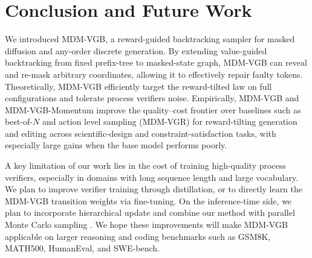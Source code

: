 \documentclass{article}
\numberwithin{theorem}{section}
\numberwithin{proposition}{section}
\numberwithin{corollary}{section}
\numberwithin{lemma}{section}
\numberwithin{conjecture}{section}
\numberwithin{remark}{section}
\numberwithin{definition}{section}
\numberwithin{assumption}{section}
\numberwithin{example}{section}
\newif\ifshowbibliography
\begin{document}
\section{Conclusion and Future Work}
\label{main:sec:Conclusion and Limitations}
We introduced MDM-VGB, a reward-guided backtracking sampler for masked diffusion and any-order discrete generation. By extending value-guided backtracking from fixed prefix-tree to masked-state graph, MDM-VGB can reveal and re-mask arbitrary coordinates, allowing it to effectively repair faulty tokens. Theoretically, MDM-VGB efficiently target the reward-tilted law on full configurations and tolerate process verifiers noise. Empirically, MDM-VGB and MDM-VGB-Momentum improve the quality--cost frontier over baselines such as best-of-$N$ and action level sampling (MDM-VGR) for reward-tilting generation and editing across scientific-design and constraint-satisfaction tasks, with especially large gains when the base model performs poorly.

A key limitation of our work lies in the cost of training high-quality process verifiers, especially in domains with long sequence length and large vocabulary. We plan to improve verifier training through distillation, or to directly learn the MDM-VGB transition weights via fine-tuning. On the inference-time side, we plan to incorporate hierarchical update and combine our method with parallel Monte Carlo sampling \citet{lee2025test}. We hope these improvements will make MDM-VGB applicable on larger reasoning and coding benchmarks such as GSM8K, MATH500, HumanEval, and SWE-bench.

\ifshowbibliography
    
    
\fi

\clearpage
\appendix
\clearpage
\tableofcontents
\clearpage
\end{document}
